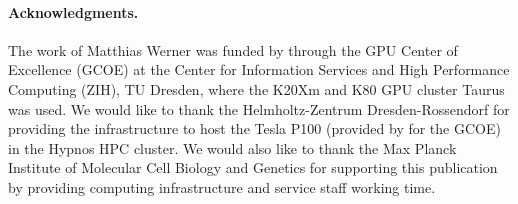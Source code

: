 \paragraph{Acknowledgments.} The work of Matthias Werner was funded by \nvidia{} through the GPU Center of Excellence (GCOE) at the Center for Information Services and High Performance Computing (ZIH), TU Dresden, where the K20Xm and K80 GPU cluster Taurus was used. We would like to thank the Helmholtz-Zentrum Dresden-Rossendorf for providing the infrastructure to host the \nvidia{} Tesla P100 (provided by \nvidia{} for the GCOE) in the Hypnos HPC cluster. We would also like to thank the Max Planck Institute of Molecular Cell Biology and Genetics for supporting this publication by providing computing infrastructure and service staff working time.
